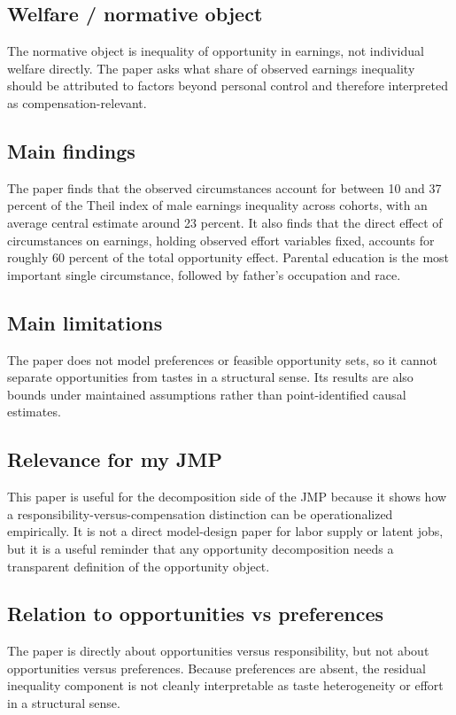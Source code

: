 \documentclass[11pt,a4paper]{article}
\begin{document}
\subsection*{Welfare / normative object}
The normative object is inequality of opportunity in earnings, not individual welfare directly. The paper asks what share of observed earnings inequality should be attributed to factors beyond personal control and therefore interpreted as compensation-relevant.

\subsection*{Main findings}
The paper finds that the observed circumstances account for between 10 and 37 percent of the Theil index of male earnings inequality across cohorts, with an average central estimate around 23 percent. It also finds that the direct effect of circumstances on earnings, holding observed effort variables fixed, accounts for roughly 60 percent of the total opportunity effect. Parental education is the most important single circumstance, followed by father’s occupation and race.

\subsection*{Main limitations}
The paper does not model preferences or feasible opportunity sets, so it cannot separate opportunities from tastes in a structural sense. Its results are also bounds under maintained assumptions rather than point-identified causal estimates.

\subsection*{Relevance for my JMP}
This paper is useful for the decomposition side of the JMP because it shows how a responsibility-versus-compensation distinction can be operationalized empirically. It is not a direct model-design paper for labor supply or latent jobs, but it is a useful reminder that any opportunity decomposition needs a transparent definition of the opportunity object.

\subsection*{Relation to opportunities vs preferences}
The paper is directly about opportunities versus responsibility, but not about opportunities versus preferences. Because preferences are absent, the residual inequality component is not cleanly interpretable as taste heterogeneity or effort in a structural sense.
\end{document}
